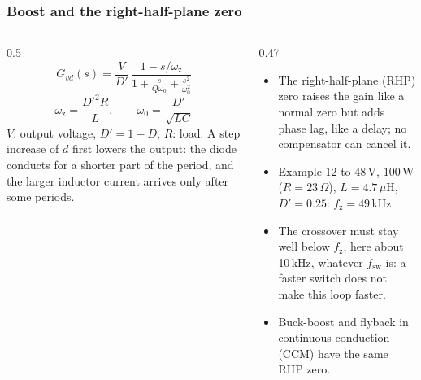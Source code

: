 \begin{frame}
	\frametitle{Boost and the right-half-plane zero}
	\begin{columns}[T]
		\begin{column}{0.5\textwidth}
			\small
			\begin{equation*}
				G_{vd}(s)=\frac{V}{D'}\,\frac{1-s/\omega_\mathrm{z}}{1+\frac{s}{Q\omega_0}+\frac{s^2}{\omega_0^2}}
			\end{equation*}
			\begin{equation*}
				\omega_\mathrm{z}=\frac{D'^2R}{L},\qquad\omega_0=\frac{D'}{\sqrt{LC}}
			\end{equation*}
			$V$: output voltage, $D'=1-D$, $R$: load. A step increase of $d$ first lowers the output: the diode conducts for a shorter part of the period, and the larger inductor current arrives only after some periods.
		\end{column}
		\begin{column}{0.47\textwidth}
			\small
			\begin{itemize}
				\item The right-half-plane (RHP) zero raises the gain like a normal zero but adds phase lag, like a delay; no compensator can cancel it.
				\item Example 12 to 48\,V, 100\,W ($R=23\,\Omega$), $L=4.7\,\mu$H, $D'=0.25$: $f_\mathrm{z}=49$\,kHz.
				\item The crossover must stay well below $f_\mathrm{z}$, here about 10\,kHz, whatever $f_\mathrm{sw}$ is: a faster switch does not make this loop faster.
				\item Buck-boost and flyback in continuous conduction (CCM) have the same RHP zero.
			\end{itemize}
		\end{column}
	\end{columns}
\end{frame}

